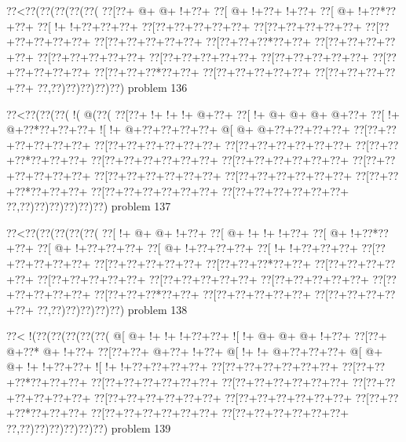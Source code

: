 \vbox{\vbox{\goo
\0??<\0??(\0??(\0??(\0??(\0??(
\0??[\0??+\- @+\- @+\- !+\0??+
\0??[\- @+\- !+\0??+\- !+\0??+
\0??[\- @+\- !+\0??*\0??+\0??+
\0??[\- !+\- !+\0??+\0??+\0??+
\0??[\0??+\0??+\0??+\0??+\0??+
\0??[\0??+\0??+\0??+\0??+\0??+
\0??[\0??+\0??+\0??+\0??+\0??+
\0??[\0??+\0??+\0??+\0??+\0??+
\0??[\0??+\0??+\0??*\0??+\0??+
\0??[\0??+\0??+\0??+\0??+\0??+
\0??[\0??+\0??+\0??+\0??+\0??+
\0??[\0??+\0??+\0??+\0??+\0??+
\0??[\0??+\0??+\0??+\0??+\0??+
\0??[\0??+\0??+\0??+\0??+\0??+
\0??[\0??+\0??+\0??*\0??+\0??+
\0??[\0??+\0??+\0??+\0??+\0??+
\0??[\0??+\0??+\0??+\0??+\0??+
\0??,\0??)\0??)\0??)\0??)\0??)
}
\hfil problem 136\hfil\break
}

\vbox{\vbox{\goo
\0??<\0??(\0??(\0??(\- !(\- @(\0??(
\0??[\0??+\- !+\- !+\- !+\- @+\0??+
\0??[\- !+\- @+\- @+\- @+\- @+\0??+
\0??[\- !+\- @+\0??*\0??+\0??+\0??+
\- ![\- !+\- @+\0??+\0??+\0??+\0??+
\- @[\- @+\- @+\0??+\0??+\0??+\0??+
\0??[\0??+\0??+\0??+\0??+\0??+\0??+
\0??[\0??+\0??+\0??+\0??+\0??+\0??+
\0??[\0??+\0??+\0??+\0??+\0??+\0??+
\0??[\0??+\0??+\0??*\0??+\0??+\0??+
\0??[\0??+\0??+\0??+\0??+\0??+\0??+
\0??[\0??+\0??+\0??+\0??+\0??+\0??+
\0??[\0??+\0??+\0??+\0??+\0??+\0??+
\0??[\0??+\0??+\0??+\0??+\0??+\0??+
\0??[\0??+\0??+\0??+\0??+\0??+\0??+
\0??[\0??+\0??+\0??*\0??+\0??+\0??+
\0??[\0??+\0??+\0??+\0??+\0??+\0??+
\0??[\0??+\0??+\0??+\0??+\0??+\0??+
\0??,\0??)\0??)\0??)\0??)\0??)\0??)
}
\hfil problem 137\hfil\break
}

\vbox{\vbox{\goo
\0??<\0??(\0??(\0??(\0??(\0??(
\0??[\- !+\- @+\- @+\- !+\0??+
\0??[\- @+\- !+\- !+\- !+\0??+
\0??[\- @+\- !+\0??*\0??+\0??+
\0??[\- @+\- !+\0??+\0??+\0??+
\0??[\- @+\- !+\0??+\0??+\0??+
\0??[\- !+\- !+\0??+\0??+\0??+
\0??[\0??+\0??+\0??+\0??+\0??+
\0??[\0??+\0??+\0??+\0??+\0??+
\0??[\0??+\0??+\0??*\0??+\0??+
\0??[\0??+\0??+\0??+\0??+\0??+
\0??[\0??+\0??+\0??+\0??+\0??+
\0??[\0??+\0??+\0??+\0??+\0??+
\0??[\0??+\0??+\0??+\0??+\0??+
\0??[\0??+\0??+\0??+\0??+\0??+
\0??[\0??+\0??+\0??*\0??+\0??+
\0??[\0??+\0??+\0??+\0??+\0??+
\0??[\0??+\0??+\0??+\0??+\0??+
\0??,\0??)\0??)\0??)\0??)\0??)
}
\hfil problem 138\hfil\break
}

\vbox{\vbox{\goo
\0??<\- !(\0??(\0??(\0??(\0??(\0??(
\- @[\- @+\- !+\- !+\- !+\0??+\0??+
\- ![\- !+\- @+\- @+\- @+\- !+\0??+
\0??[\0??+\- @+\0??*\- @+\- !+\0??+
\0??[\0??+\0??+\- @+\0??+\- !+\0??+
\- @[\- !+\- !+\- @+\0??+\0??+\0??+
\- @[\- @+\- @+\- !+\- !+\0??+\0??+
\- ![\- !+\- !+\0??+\0??+\0??+\0??+
\0??[\0??+\0??+\0??+\0??+\0??+\0??+
\0??[\0??+\0??+\0??*\0??+\0??+\0??+
\0??[\0??+\0??+\0??+\0??+\0??+\0??+
\0??[\0??+\0??+\0??+\0??+\0??+\0??+
\0??[\0??+\0??+\0??+\0??+\0??+\0??+
\0??[\0??+\0??+\0??+\0??+\0??+\0??+
\0??[\0??+\0??+\0??+\0??+\0??+\0??+
\0??[\0??+\0??+\0??*\0??+\0??+\0??+
\0??[\0??+\0??+\0??+\0??+\0??+\0??+
\0??[\0??+\0??+\0??+\0??+\0??+\0??+
\0??,\0??)\0??)\0??)\0??)\0??)\0??)
}
\hfil problem 139\hfil\break
}

